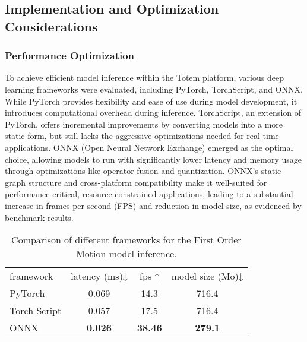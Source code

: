 \subsection{Implementation and Optimization Considerations}

\subsubsection{Performance Optimization}
To achieve efficient model inference within the Totem platform, various deep learning frameworks were evaluated, including PyTorch, TorchScript, and ONNX.
While PyTorch provides flexibility and ease of use during model development, it introduces computational overhead during inference.
TorchScript, an extension of PyTorch, offers incremental improvements by converting models into a more static form, but still lacks the aggressive optimizations needed for real-time applications.
ONNX (Open Neural Network Exchange) emerged as the optimal choice, allowing models to run with significantly lower latency and memory usage through optimizations like operator fusion and quantization.
ONNX’s static graph structure and cross-platform compatibility make it well-suited for performance-critical, resource-constrained applications, leading to a substantial increase in frames per second (FPS) and reduction in model size, as evidenced by benchmark results.

\begin{table}[h]
\footnotesize%
\begin{center}
    \begin{tabular}{lccc}
    \toprule
    framework    & latency (ms)↓ & fps ↑  & model size (Mo)↓ \\
    PyTorch      & 0.069        & 14.3  & 716.4           \\
    Torch Script & 0.057        & 17.5  & 716.4           \\
    ONNX         & \textbf{0.026}& \textbf{38.46} & \textbf{279.1}           \\
    \bottomrule
    \end{tabular}
\end{center}
\caption{Comparison of different frameworks for the First Order Motion model inference.}
\label{tab:frameworks}
\end{table}

